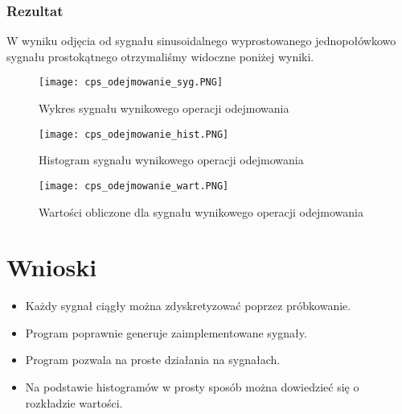 \documentclass[12pt]{article}
\begin{document}
\subsubsection{Rezultat}
W wyniku odjęcia od sygnału sinusoidalnego wyprostowanego jednopołówkowo sygnału prostokątnego otrzymaliśmy widoczne poniżej wyniki.
\begin{figure}[H]
    \centering
    \texttt{[image: cps\_odejmowanie\_syg.PNG]}
    \caption{Wykres sygnału wynikowego operacji odejmowania}
    \label{wykres dla odejmowania}
\end{figure}
\begin{figure}[H]
    \centering
    \texttt{[image: cps\_odejmowanie\_hist.PNG]}
    \caption{Histogram sygnału wynikowego operacji odejmowania}
    \label{histogram dla odejmowania}
\end{figure}
\begin{figure}[H]
    \centering
    \texttt{[image: cps\_odejmowanie\_wart.PNG]}
    \caption{Wartości obliczone dla sygnału wynikowego operacji odejmowania}
    \label{wartosci dla odejmowania}
\end{figure}





\section{Wnioski}
\begin{itemize}
    \item Każdy sygnał ciągły można zdyskretyzować poprzez próbkowanie.
    \item Program poprawnie generuje zaimplementowane sygnały.
    \item Program pozwala na proste działania na sygnałach.
    \item Na podstawie histogramów w prosty sposób można dowiedzieć się o rozkładzie wartości.
\end{itemize}
 


\renewcommand\refname{Bibliografia}


\end{document}
